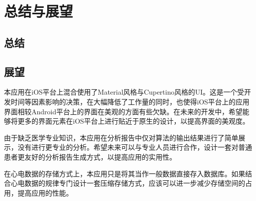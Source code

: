 \chapter{总结与展望}\label{ch:conc}


\section{总结}\label{sec:conc}



\section{展望}\label{sec:pros}


本应用在iOS平台上混合使用了Material风格与Cupertino风格的UI。这是一个受开发时间等因素影响的决策，在大幅降低了工作量的同时，也使得iOS平台上的应用界面相较Android平台上的界面在美观的方面有些欠缺。在未来的开发中，希望能够将更多的界面元素在iOS平台上进行贴近于原生的设计，以提高界面的美观度。

由于缺乏医学专业知识，本应用在分析报告中仅对算法的输出结果进行了简单展示，没有进行更专业的分析。希望未来可以与专业人员进行合作，设计一套对普通患者更友好的分析报告生成方式，以提高应用的实用性。

在心电数据的存储方式上，本应用只是将其当作一般数据直接存入数据库。如果结合心电数据的规律专门设计一套压缩存储方式，应该可以进一步减少存储空间的占用，提高应用的性能。
